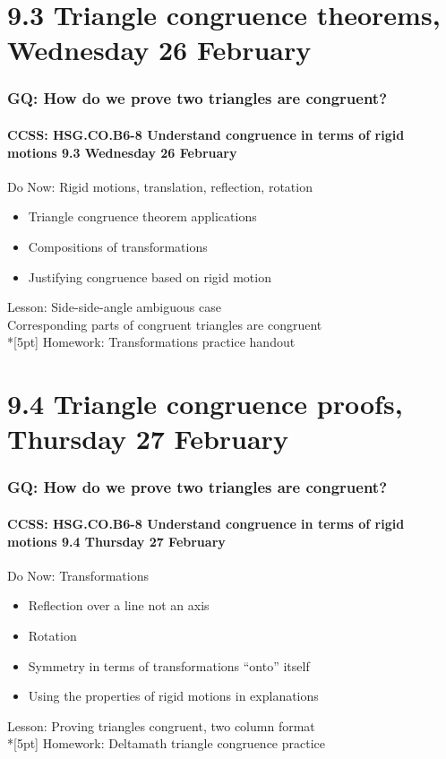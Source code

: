 \documentclass{beamer}
\begin{document}
\section{9.3 Triangle congruence theorems, Wednesday 26 February} 
\frame
{
  \frametitle{GQ: How do we prove two triangles are congruent?}
  \framesubtitle{CCSS: HSG.CO.B6-8 Understand congruence in terms of rigid motions \hfill \alert{9.3 Wednesday 26 February}}

  \begin{block}{Do Now: Rigid motions, translation, reflection, rotation}
    \begin{itemize}
      \item Triangle congruence theorem applications
      \item Compositions of transformations
      \item Justifying congruence based on rigid motion
    \end{itemize}
    \end{block}
    Lesson: Side-side-angle ambiguous case \\
    Corresponding parts of congruent triangles are congruent\\*[5pt]
    Homework: Transformations practice handout
}


\section{9.4 Triangle congruence proofs, Thursday 27 February}
\frame
{
  \frametitle{GQ: How do we prove two triangles are congruent?}
  \framesubtitle{CCSS: HSG.CO.B6-8 Understand congruence in terms of rigid motions \hfill \alert{9.4 Thursday 27 February}}

  \begin{block}{Do Now: Transformations}
    \begin{itemize}
      \item Reflection over a line not an axis
      \item Rotation
      \item Symmetry in terms of transformations ``onto'' itself
      \item Using the properties of rigid motions in explanations
    \end{itemize}
    \end{block}
    Lesson: Proving triangles congruent, two column format \\*[5pt]
    Homework: Deltamath triangle congruence practice
}
\end{document}
